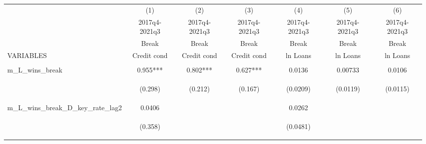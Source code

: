 \documentclass[]{article}
\begin{document}
\begin{center}
\begin{tabular}{lcccccc} \hline
 & (1) & (2) & (3) & (4) & (5) & (6) \\
 & 2017q4-2021q3 & 2017q4-2021q3 & 2017q4-2021q3 & 2017q4-2021q3 & 2017q4-2021q3 & 2017q4-2021q3 \\
 & Break & Break & Break & Break & Break & Break \\
VARIABLES & Credit cond & Credit cond & Credit cond & ln Loans & ln Loans & ln Loans \\ \hline
\vspace{4pt} & \begin{footnotesize}\end{footnotesize} & \begin{footnotesize}\end{footnotesize} & \begin{footnotesize}\end{footnotesize} & \begin{footnotesize}\end{footnotesize} & \begin{footnotesize}\end{footnotesize} & \begin{footnotesize}\end{footnotesize} \\
m\_L\_wins\_break & 0.955*** & 0.802*** & 0.627*** & 0.0136 & 0.00733 & 0.0106 \\
\vspace{4pt} & \begin{footnotesize}(0.298)\end{footnotesize} & \begin{footnotesize}(0.212)\end{footnotesize} & \begin{footnotesize}(0.167)\end{footnotesize} & \begin{footnotesize}(0.0209)\end{footnotesize} & \begin{footnotesize}(0.0119)\end{footnotesize} & \begin{footnotesize}(0.0115)\end{footnotesize} \\
m\_L\_wins\_break\_D\_key\_rate\_lag2 & 0.0406 &  &  & 0.0262 &  &  \\
\vspace{4pt} & \begin{footnotesize}(0.358)\end{footnotesize} & \begin{footnotesize}\end{footnotesize} & \begin{footnotesize}\end{footnotesize} & \begin{footnotesize}(0.0481)\end{footnotesize} & \begin{footnotesize}\end{footnotesize} & \begin{footnotesize}\end{footnotesize} \\

\end{tabular}
\end{center}
\end{document}
